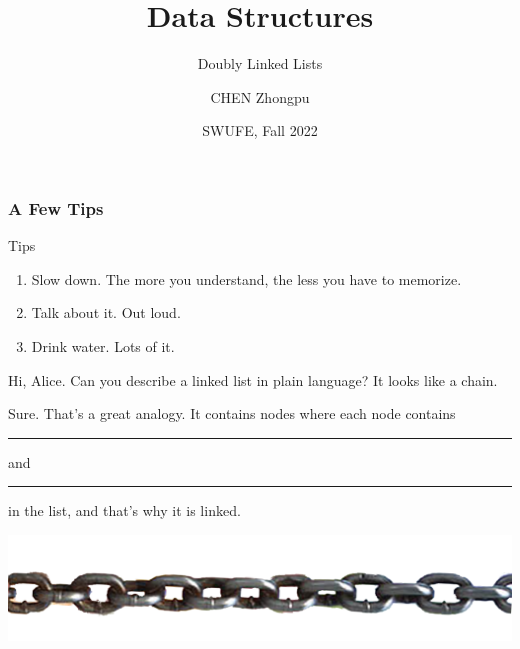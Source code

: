 \documentclass[aspectratio=169, 14pt]{beamer}
\title[Data Structures] %
{Data Structures}
\subtitle{Doubly Linked Lists}
\author[CHEN Zhongpu] %
{CHEN Zhongpu}
\institute[] %
{
  School of Computing and Artificial Intelligence \\
  \href{mailto:zpchen@swufe.edu.cn}{zpchen@swufe.edu.cn}
}
\date[] %
{SWUFE, Fall 2022}
\begin{document}
\frame{\titlepage}


\begin{frame}
    \frametitle{A Few Tips}

    \begin{exampleblock}{Tips}
        \begin{enumerate}
            \item {} Slow down. The more you understand, the less you have to memorize.
            \item {} Talk about it. Out loud.
            \item {} Drink water. Lots of it.
        \end{enumerate}        
    \end{exampleblock}

\end{frame}

\begin{frame}[fragile]
    \begin{leftbubbles}
Hi, Alice. Can you describe a linked list in plain language? It looks like a chain.        
    \end{leftbubbles}
\begin{rightbubbles}
Sure. That's a great analogy. It contains nodes where each node contains \rule{1cm}{0.15mm} and \rule{1cm}{0.15mm} in the list, and that's why it is linked.  
\end{rightbubbles}

\includegraphics[width=.5\textwidth]{week6/chain}


\end{frame}
\end{document}
